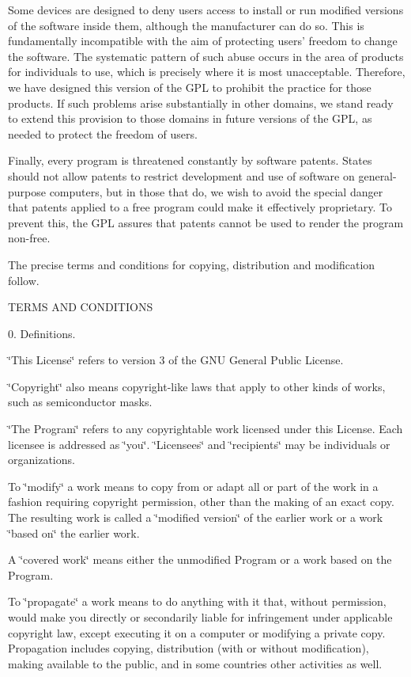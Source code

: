 Some devices are designed to deny users access to install or run modified versions of the software inside them, although the manufacturer can do so. This is fundamentally incompatible with the aim of protecting users' freedom to change the software. The systematic pattern of such abuse occurs in the area of products for individuals to use, which is precisely where it is most unacceptable. Therefore, we have designed this version of the G\-P\-L to prohibit the practice for those products. If such problems arise substantially in other domains, we stand ready to extend this provision to those domains in future versions of the G\-P\-L, as needed to protect the freedom of users.

Finally, every program is threatened constantly by software patents. States should not allow patents to restrict development and use of software on general-\/purpose computers, but in those that do, we wish to avoid the special danger that patents applied to a free program could make it effectively proprietary. To prevent this, the G\-P\-L assures that patents cannot be used to render the program non-\/free.

The precise terms and conditions for copying, distribution and modification follow.

T\-E\-R\-M\-S A\-N\-D C\-O\-N\-D\-I\-T\-I\-O\-N\-S

0. Definitions.

\char`\"{}\-This License\char`\"{} refers to version 3 of the G\-N\-U General Public License.

\char`\"{}\-Copyright\char`\"{} also means copyright-\/like laws that apply to other kinds of works, such as semiconductor masks.

\char`\"{}\-The Program\char`\"{} refers to any copyrightable work licensed under this License. Each licensee is addressed as \char`\"{}you\char`\"{}. \char`\"{}\-Licensees\char`\"{} and \char`\"{}recipients\char`\"{} may be individuals or organizations.

To \char`\"{}modify\char`\"{} a work means to copy from or adapt all or part of the work in a fashion requiring copyright permission, other than the making of an exact copy. The resulting work is called a \char`\"{}modified version\char`\"{} of the earlier work or a work \char`\"{}based on\char`\"{} the earlier work.

A \char`\"{}covered work\char`\"{} means either the unmodified Program or a work based on the Program.

To \char`\"{}propagate\char`\"{} a work means to do anything with it that, without permission, would make you directly or secondarily liable for infringement under applicable copyright law, except executing it on a computer or modifying a private copy. Propagation includes copying, distribution (with or without modification), making available to the public, and in some countries other activities as well.

